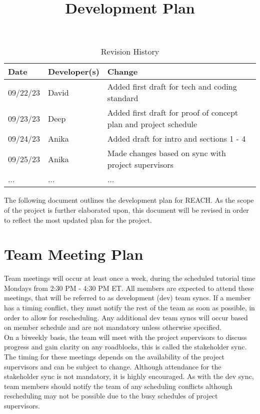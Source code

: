\documentclass{article}
\title{Development Plan\\\progname}
\author{\authname}
\date{}
\begin{document}
\maketitle

\begin{table}[hp]
\caption{Revision History} \label{TblRevisionHistory}
\begin{tabularx}{\textwidth}{llX}
\toprule
\textbf{Date} & \textbf{Developer(s)} & \textbf{Change}\\
\midrule
09/22/23 & David & Added first draft for tech and coding standard\\
09/23/23 & Deep & Added first draft for proof of concept plan and project schedule\\
09/24/23 & Anika & Added draft for intro and sections 1 - 4 \\
09/25/23 & Anika & Made changes based on sync with project supervisors \\
... & ... & ...\\
\bottomrule
\end{tabularx}
\end{table}


\noindent The following document outlines the development plan for REACH.
As the scope of the project is further elaborated upon, 
this document will be revised in order to reflect the most updated plan for the project.\\


\section{Team Meeting Plan} 
Team meetings will occur at least once a week, during the scheduled tutorial time Mondays from 2:30 PM - 4:30 PM ET.
All members are expected to attend these meetings, that will be referred to as development (dev) team syncs. 
If a member has a timing conflict, they must notify the rest of the team as soon as possible, in order to allow for rescheduling.
Any additional dev team syncs will occur based on member schedule and are not mandatory unless otherwise specified.\\

On a biweekly basis, the team will meet with the project supervisors to discuss progress and gain clarity on any roadblocks, this is called the stakeholder sync. 
The timing for these meetings depends on the availability of the project supervisors and can be subject to change. 
Although attendance for the stakeholder sync is not mandatory, it is highly encouraged. 
As with the dev sync, team members should notify the team of any scheduling conflicts although rescheduling may not be possible due to the busy schedules of project supervisors. \\
\end{document}
